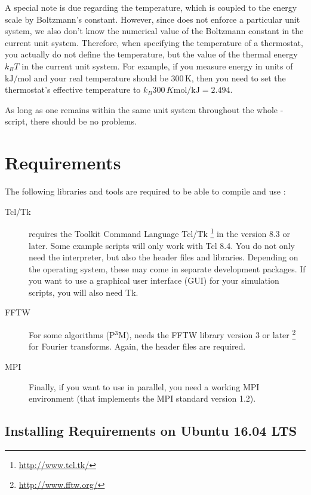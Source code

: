 A special note is due regarding the temperature, which is coupled to
the energy scale by Boltzmann's constant. However, since \es{} does not
enforce a particular unit system, we also don't know the numerical value
of the Boltzmann constant in the current unit system. Therefore, when
specifying the temperature of a thermostat, you actually do not define
the temperature, but the value of the thermal energy $k_B T$ in the
current unit system. For example, if you measure energy in units of
$\mathrm{kJ/mol}$ and your real temperature should be 300\,K, then you need to
set the thermostat's effective temperature to
$k_B 300\, K \mathrm{mol / kJ} = 2.494$.

As long as one remains within the same unit system throughout the
whole \es-script, there should be no problems.

\section{Requirements}
\label{sec:requirements}

The following libraries and tools are required to be able to compile
and use \es:

\begin{description}
\item[Tcl/Tk]  \es{} requires the Toolkit Command
  Language Tcl/Tk \footnote{\url{http://www.tcl.tk/}} in the version
  8.3 or later.  Some example scripts will only work with Tcl 8.4. You
  do not only need the interpreter, but also the header files and
  libraries.  Depending on the operating system, these may come in
  separate development packages. If you want to use a graphical user
  interface (GUI) for your simulation scripts, you will also need Tk.
  
\item[FFTW]  For some algorithms (\eg P$^3$M), \es needs
  the FFTW library version 3 or later
  \footnote{\url{http://www.fftw.org/}} for Fourier transforms.
  Again, the header files are required.
  
\item[MPI]  Finally, if you want to use \es in parallel,
  you need a working MPI environment (that implements the MPI standard
  version 1.2).
\end{description}

\subsection{Installing Requirements on Ubuntu 16.04 LTS}
\label{sec:installing-requirements}

